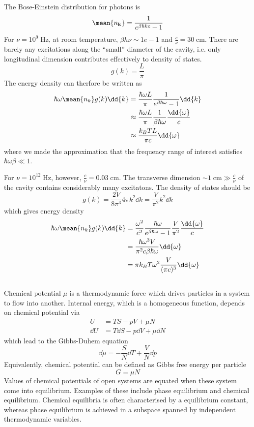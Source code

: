 \documentclass[12pt]{article}
\begin{document}
     \subsection{} The Bose-Einstein distribution for photons is \[
        \mean{n_{\bf k}} = \frac{1}{e^{\beta \hbar kc} - 1}
    \]
    For \(\nu = 10^9 \; \mathrm{Hz}\), at room temperature, \(\beta h \nu \sim 1e - 1\) and \(\frac{c}{\nu} = 30 \;\mathrm{cm}\). There are barely any excitations along the ``small'' diameter of the cavity, i.e. only longitudinal dimension contributes effectively to density of states. 
    \[
        g(k) = \frac{L}{\pi}
    \]
    The energy density can therfore be written as \begin{align*}
        \hbar\omega\mean{n_k} g(k) \dd{k} &= \frac{\hbar \omega L}{\pi} \frac{1}{e^{\beta \hbar \omega} - 1} \dd{k}\\
        & \approx  \frac{\hbar \omega L}{\pi} \frac{1}{\beta \hbar \omega} \frac{\dd{\omega}}{c}\\
        & \approx  \frac{k_BT L}{\pi c} \dd{\omega}
    \end{align*}
    where we made the approximation that the frequency range of interest satisfies \(\hbar\omega\beta \ll 1\).

    For \(\nu = 10^{12}\; \mathrm{Hz}\), however, \(\frac{c}{\nu} = 0.03 \;\mathrm{cm}\). The transverse dimension \(\sim 1\; \mathrm{cm} \gg \frac{c}{\nu}\) of the cavity contains considerably many excitatons. The density of states should be \[
        g(k) = \frac{2V}{8\pi^3} 4\pi k^2 \dd{k} = \frac{V}{\pi^2} k^2\dd{k}
    \]
    which gives energy density \begin{align*}
        \hbar\omega\mean{n_k} g(k) \dd{k} &= \frac{\omega^2}{c^2}\frac{\hbar \omega}{e^{\beta \hbar \omega} - 1} \frac{V}{\pi^2} \frac{\dd{\omega}}{c}  \\
        &= \frac{\hbar \omega^3 V}{\pi^2 c \beta \hbar \omega} \dd{\omega}\\
        &= \pi k_BT \omega^2\frac{V}{(\pi c)^3} \dd{\omega}
    \end{align*}
     \subsection{} Chemical potential \(\mu\) is a thermodynamic force which drives particles in a system to flow into another. Internal energy, which is a homogeneous function, depends on chemical potential via \begin{align*}
        U &=  TS - pV + \mu N\\
        \dd{U} &= T\dd{S} - p\dd{V} + \mu\dd{N} 
    \end{align*}
    which lead to the Gibbs-Duhem equation
    \[
        \dd{\mu} = - \frac{S}{N} \dd{T} + \frac{V}{N}\dd{p}
    \]
    Equivalently, chemical potential can be defined as Gibbs free energy per particle \[
        G = \mu N
    \] Values of chemical potentials of open systems are equated when these system come into equilibrium. Examples of these include phase equilibrium and chemical equilibrium. Chemical equilibria is often characterised by a equilibrium constant, whereas phase equilibrium is achieved in a subspace spanned by independent thermodynamic variables.
\end{document}
